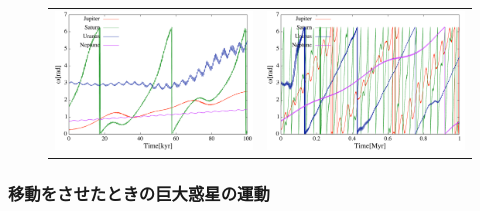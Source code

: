 \documentclass[11pt,a4paper,oneside,onecolumn]{jarticle}
\begin{document}
\begin{figure}[H]
\begin{tabular}{cc}
\begin{minipage}[t]{0.45\hsize}
\centering
\includegraphics[width=7.6cm]{./image/Nomove_smallomega_100kyr.pdf}
\end{minipage} &
\begin{minipage}[t]{0.45\hsize}
\centering
\includegraphics[width=7.6cm]{./image/Nomove_smallomega_1Myr.pdf}
\end{minipage}
%
\end{tabular}
\caption{\label{}}
\end{figure}


\subsubsection{移動をさせたときの巨大惑星の運動}
\end{document}

